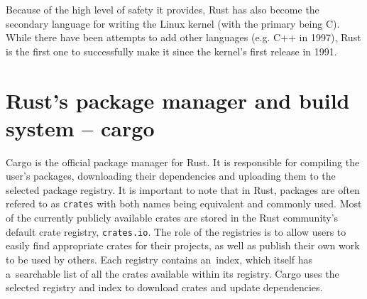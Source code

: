\documentclass[licencjacka,en]{pracamgr}
\begin{document}
Because of the high level of safety it provides, Rust has also become the secondary
language for writing the Linux kernel (with the primary being C). While there have been
attempts to add other languages (e.g. C++ in 1997), Rust is the first one to successfully
make it since the kernel's first release in 1991.

\section{Rust's package manager and build system -- cargo}\label{r:section_cargo}

Cargo is the official package manager for Rust. It is responsible for compiling the user's
packages, downloading their dependencies and uploading them to the selected package registry.
It is important to note that in Rust, packages are often refered to as \texttt{crates} with both
names being equivalent and commonly used. Most of the currently publicly available crates are
stored in the Rust community's default crate registry, \texttt{crates.io}. The role of the
registries is to allow users to easily find appropriate crates for their projects, as well as
publish their own work to be used by others. Each registry contains an~index, which itself has
a~searchable list of all the crates available within its registry. Cargo uses the selected registry
and index to download crates and update dependencies.
\end{document}
